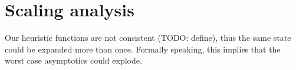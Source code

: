 \section{Scaling analysis}

Our heuristic functions are not consistent (TODO: define), thus the same state
could be expanded more than once. Formally speaking, this implies that the worst
case asymptotics could explode.